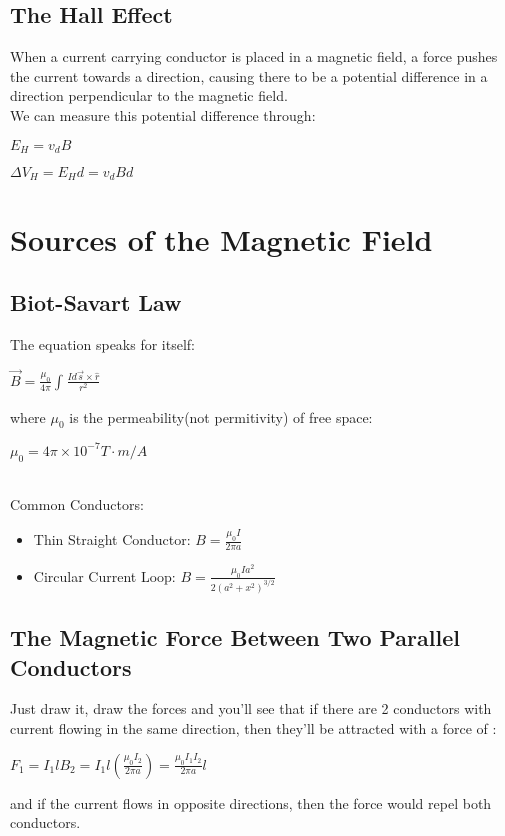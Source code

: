 \documentclass{report}
\begin{document}
	\section{The Hall Effect}
		When a current carrying conductor is placed in a magnetic field, a force pushes the current towards a direction, causing there to be a potential difference in a direction perpendicular to the magnetic field.\\
		We can measure this potential difference through:\\
		\centerline{$E_H = v_dB$}
		\centerline{$\Delta V_H = E_Hd = v_dBd$}
\chapter{Sources of the Magnetic Field}
	\section{Biot-Savart Law}
		The equation speaks for itself:\\
		\centerline{$\vec{B} = \frac{\mu_0}{4\pi} \int_{}^{}\frac{Id\vec{s} \times \hat{r}}{r^2}$}
		where $\mu_0$ is the permeability(not permitivity) of free space:\\
		\centerline{$\mu_0 = 4\pi \times 10^{-7} T \cdot m/A$}
		\\
		Common Conductors:\\
		\begin{itemize}
			\item Thin Straight Conductor: $B = \frac{\mu_0 I}{2\pi a}$
			\item Circular Current Loop: $B = \frac{\mu_0 Ia^2}{2(a^2+x^2)^{3/2}}$
		\end{itemize}
	\section{The Magnetic Force Between Two Parallel Conductors}
		Just draw it, draw the forces and you'll see that if there are 2 conductors with current flowing in the same direction, then they'll be attracted with a force of :\\
		\centerline{$F_1 = I_1lB_2 = I_1l(\frac{\mu_0I_2}{2\pi a}) = \frac{\mu_0I_1I_2}{2\pi a}l$}
		and if the current flows in opposite directions, then the force would repel both conductors.
\end{document}
